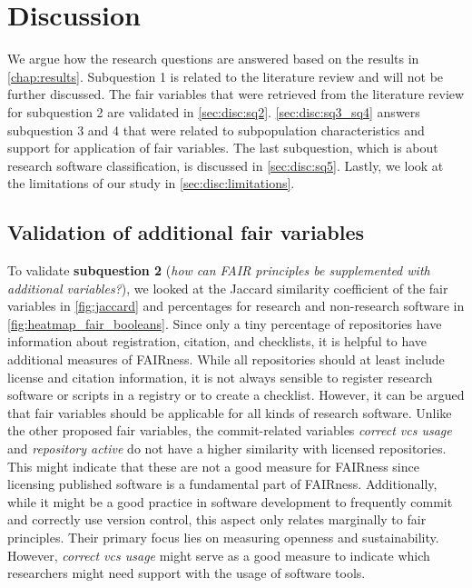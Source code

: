 \vspace{-1cm}
\chapter{Discussion}
\label{chap:discussion}
We argue how the research questions are answered based on the results in \autoref{chap:results}. Subquestion 1 is related to the literature review and will not be further discussed. The \acrshort{fair} variables that were retrieved from the literature review for subquestion 2 are validated in \autoref{sec:disc:sq2}. \autoref{sec:disc:sq3_sq4} answers subquestion 3 and 4 that were related to subpopulation characteristics and support for application of \acrshort{fair} variables. The last subquestion, which is about research software classification, is discussed in \autoref{sec:disc:sq5}. Lastly, we look at the limitations of our study in \autoref{sec:disc:limitations}.


\section{Validation of additional \acrshort{fair} variables}
\label{sec:disc:sq2}
To validate \textbf{subquestion 2} (\textit{how can FAIR principles be supplemented with additional variables?}), we looked at the Jaccard similarity coefficient of the \acrshort{fair} variables in \autoref{fig:jaccard} and percentages for research and non-research software in \autoref{fig:heatmap_fair_booleans}. Since only a tiny percentage of repositories have information about registration, citation, and checklists, it is helpful to have additional measures of FAIRness. While all repositories should at least include license and citation information, it is not always sensible to register research software or scripts in a registry or to create a checklist. 
However, it can be argued that \acrshort{fair} variables should be applicable for all kinds of research software. Unlike the other proposed \acrshort{fair} variables, the commit-related variables \textit{correct vcs usage} and \textit{repository active} do not have a higher similarity with licensed repositories. This might indicate that these are not a good measure for FAIRness since licensing published software is a fundamental part of FAIRness. Additionally, while it might be a good practice in software development to frequently commit and correctly use version control, this aspect only relates marginally to \acrshort{fair} principles. Their primary focus lies on measuring openness and sustainability. However, \textit{correct vcs usage} might serve as a good measure to indicate which researchers might need support with the usage of software tools.

